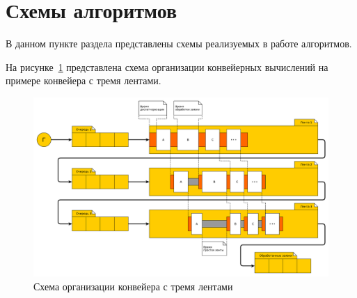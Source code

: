 \documentclass[12pt]{report}
\begin{document}
    \section{Схемы алгоритмов}
    В данном пункте раздела представлены схемы реализуемых в работе алгоритмов.
    
    На рисунке~\ref{img:conveer} представлена схема организации конвейерных вычислений на примере конвейера с тремя лентами.
    \begin{figure}[H]
    	\centering
    	\includegraphics[width=1.00\linewidth]{img/conveer}
    	\caption{Схема организации конвейера с тремя лентами}
    	\label{img:conveer}
    \end{figure}
\end{document}
